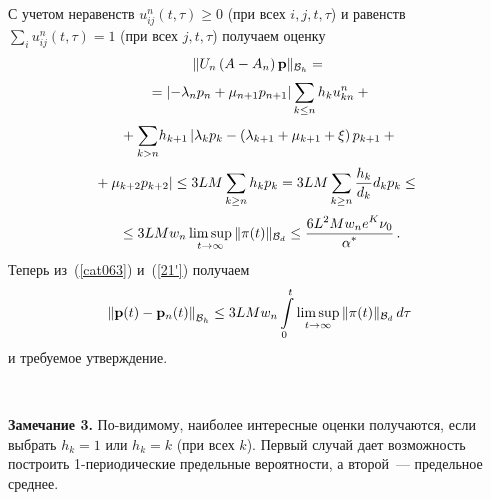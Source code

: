 \begin{multicols}{2}
С учетом неравенств $ u_{ij}^n (t,\tau) \ge 0$ (при всех $i,j,
t,\tau $) и равенств $\sum\limits_i u_{ij}^n (t,\tau) = 1$ (при всех $j,
t,\tau $) получаем оценку
\begin{multline}
\|U_n \left(A -A_n \right) {\bf p}\|_{{\cal B}_h} ={}\\[2pt]
{}=
\left|-\lambda_np_n + \mu_{n+1}p_{n+1}\right|\sum_{k\leq n} h_k
u_{kn}^n +  {}\\[2pt]
{}+ \sum\limits_{k > n}\! h_{k+1} \left| \lambda_kp_k
 - \left(\lambda_{k+1} + \mu_{k+1} + \xi \right)p_{k+1} +{}\right.\\[2pt]
\!\!\!\left.{}+\mu_{k+2}p_{k+2} \right| \le
 3LM  \sum_{k \ge n} h_k p_k = 
 3LM\sum_{k \ge n} \displaystyle\frac{\displaystyle h_k\mathstrut}{\displaystyle d_k\mathstrut} d_k p_k \le{}\\[2pt]
 {}\le 3LMw_n
\limsup_{t \to \infty} \|{\bf \pi} (t)\|_{{\cal B}_d} \le
\displaystyle\frac{\displaystyle 6L^2Mw_n e^K\nu_0\mathstrut}{\displaystyle \alpha^*\mathstrut} \,. 
\label{21'}
\end{multline}
Теперь из~(\ref{cat063}) и~(\ref{21'}) получаем
\begin{equation*}
\left\|{\bf p} (t) - {\bf p}_n (t)\right\|_{{\cal B}_h} %
\le  3LM w_n
\int\limits_0^t \limsup_{t \to \infty} \|{\bf \pi} (t)\|_{{\cal
B}_d}\, d\tau 
\end{equation*}
и требуемое утверждение.

\smallskip

\begin{figure*}[b] %
\vspace*{1pt}
\begin{center}
\mbox{%
\epsfxsize=165.71mm
}
\end{center}
\vspace*{-9pt}
\begin{minipage}[t]{80mm}
\end{minipage}
\hfill
\begin{minipage}[t]{80mm}
\end{minipage}
\end{figure*}

\noindent
\textbf{Замечание 3.}
По-видимому, наиболее интересные оценки получаются, если выбрать  $h_k=1$ или $h_k=k$ (при всех $k$).
Первый случай дает возможность построить 1-периодические предельные
вероятности, а второй~--- предельное среднее.

\smallskip


\end{multicols}
